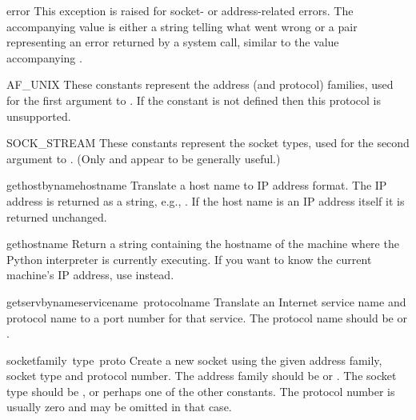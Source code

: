 \renewcommand{\indexsubitem}{(in module socket)}
\begin{excdesc}{error}
This exception is raised for socket- or address-related errors.
The accompanying value is either a string telling what went wrong or a
pair 
representing an error returned by a system
call, similar to the value accompanying .
\end{excdesc}

\begin{datadesc}{AF_UNIX}
These constants represent the address (and protocol) families,
used for the first argument to .  If the 
constant is not defined then this protocol is unsupported.
\end{datadesc}

\begin{datadesc}{SOCK_STREAM}
These constants represent the socket types,
used for the second argument to .
(Only  and
 appear to be generally useful.)
\end{datadesc}

\begin{funcdesc}{gethostbyname}{hostname}
Translate a host name to IP address format.  The IP address is
returned as a string, e.g.,  .  If the host name
is an IP address itself it is returned unchanged.
\end{funcdesc}

\begin{funcdesc}{gethostname}{}
Return a string containing the hostname of the machine where 
the Python interpreter is currently executing.  If you want to know the
current machine's IP address, use
 instead.
\end{funcdesc}

\begin{funcdesc}{getservbyname}{servicename\, protocolname}
Translate an Internet service name and protocol name to a port number
for that service.  The protocol name should be  or
.
\end{funcdesc}

\begin{funcdesc}{socket}{family\, type\, proto}
Create a new socket using the given address family, socket type and
protocol number.  The address family should be  or
.  The socket type should be ,
 or perhaps one of the other  constants.
The protocol number is usually zero and may be omitted in that case.
\end{funcdesc}

